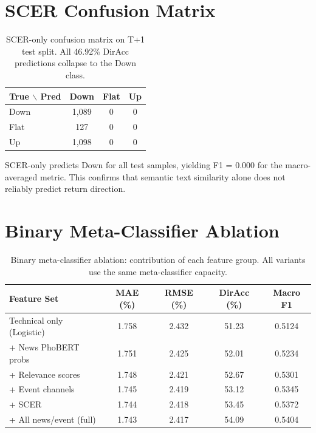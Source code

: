 \documentclass[runningheads]{llncs}
\begin{document}
\section{SCER Confusion Matrix}
\label{sec:scer_confusion}

\begin{table}[htbp]
\centering
\caption{SCER-only confusion matrix on T+1 test split. All 46.92\% DirAcc predictions collapse to the Down class.}
\label{tab:supp_scer_confusion}
\begin{tabular}{lccc}
\toprule
True $\backslash$ Pred & Down & Flat & Up \\
\midrule
Down & 1{,}089 & 0 & 0 \\
Flat & 127 & 0 & 0 \\
Up & 1{,}098 & 0 & 0 \\
\bottomrule
\end{tabular}
\end{table}

SCER-only predicts Down for all test samples, yielding F1 = 0.000 for the macro-averaged metric. This confirms that semantic text similarity alone does not reliably predict return direction.

\section{Binary Meta-Classifier Ablation}
\label{sec:meta_ablation}

\begin{table}[htbp]
\centering
\caption{Binary meta-classifier ablation: contribution of each feature group. All variants use the same meta-classifier capacity.}
\label{tab:supp_meta_ablation}
\begin{tabular}{lcccc}
\toprule
Feature Set & MAE (\%) & RMSE (\%) & DirAcc (\%) & Macro F1 \\
\midrule
Technical only (Logistic) & 1.758 & 2.432 & 51.23 & 0.5124 \\
+ News PhoBERT probs & 1.751 & 2.425 & 52.01 & 0.5234 \\
+ Relevance scores & 1.748 & 2.421 & 52.67 & 0.5301 \\
+ Event channels & 1.745 & 2.419 & 53.12 & 0.5345 \\
+ SCER & 1.744 & 2.418 & 53.45 & 0.5372 \\
+ All news/event (full) & 1.743 & 2.417 & 54.09 & 0.5404 \\
\bottomrule
\end{tabular}
\end{table}
\end{document}
